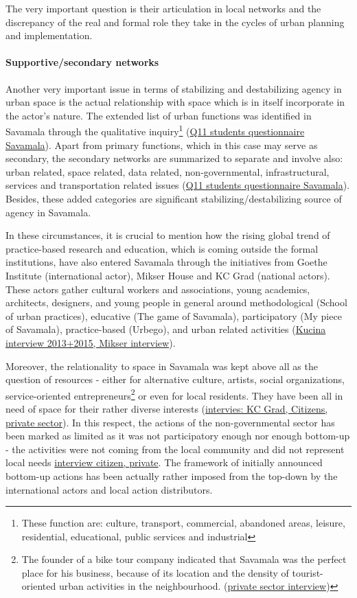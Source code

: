 \documentclass[11pt]{report}
\begin{document}
The very important question is their articulation in local networks and the discrepancy of the real and formal role they take in the cycles of urban planning and implementation.

\paragraph{Supportive/secondary networks}

Another very important issue in terms of stabilizing and destabilizing agency in urban space is the actual relationship with space which is in itself incorporate in the actor's nature.
The extended list of urban functions was identified in Savamala through the qualitative inquiry\footnote{These function are: culture, transport, commercial, abandoned areas, leisure, residential, educational, public services and industrial}
(\href{}{Q11 students questionnaire Savamala}).
Apart from primary functions, which in this case may serve as secondary, the secondary networks are summarized to separate and involve also: urban related, space related, data related, non-governmental, infrastructural, services and transportation related issues (\href{}{Q11 students questionnaire Savamala}).
Besides, these added categories are significant stabilizing/destabilizing source of agency in Savamala.

In these circumstances, it is crucial to mention how the rising global trend of practice-based research and education, which is coming outside the formal institutions, have also entered Savamala through the initiatives from Goethe Institute (international actor), Mikser House and KC Grad (national actors). These actors gather cultural workers and associations, young academics, architects, designers, and young people in general around methodological (School of urban practices), educative (The game of Savamala), participatory (My piece of Savamala), practice-based (Urbego), and urban related activities (\href{}{Kucina interview 2013+2015, Mikser interview}).

Moreover, the relationality to space in Savamala was kept above all as the question of resources - either for alternative culture, artists, social organizations, service-oriented entrepreneurs\footnote{The founder of a bike tour company indicated that Savamala was the perfect place for his business, because of its location and the density of tourist-oriented urban activities in the neighbourhood. (\href{}{private sector interview})}
or even for local residents.
They have been all in need of space for their rather diverse interests (\href{}{intervies: KC Grad, Citizens, private sector}).
In this respect, the actions of the non-governmental sector has been marked as limited as it was not  participatory enough nor enough bottom-up - the activities were not coming from the local community and did not represent local needs \href{}{interview citizen, private}.
The framework of initially announced bottom-up actions has been actually rather imposed from the top-down by the international actors and local action distributors.
\end{document}

